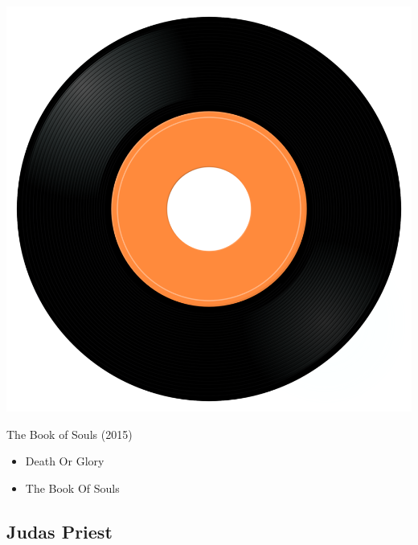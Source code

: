 \begin{minipage}[t]{0.25\textwidth}
\captionsetup{type=figure}
\includegraphics[width=\textwidth]{Images/cover.png}
\caption*{The Book of Souls (2015)}
\end{minipage}
\begin{minipage}[t]{0.25\textwidth}\vspace{0pt}
\begin{itemize}[nosep,leftmargin=1em,labelwidth=*,align=left]
	\setlength{\itemsep}{0pt}
	\item Death Or Glory
	\item The Book Of Souls
\end{itemize}
\end{minipage}

\subsection{Judas Priest}

